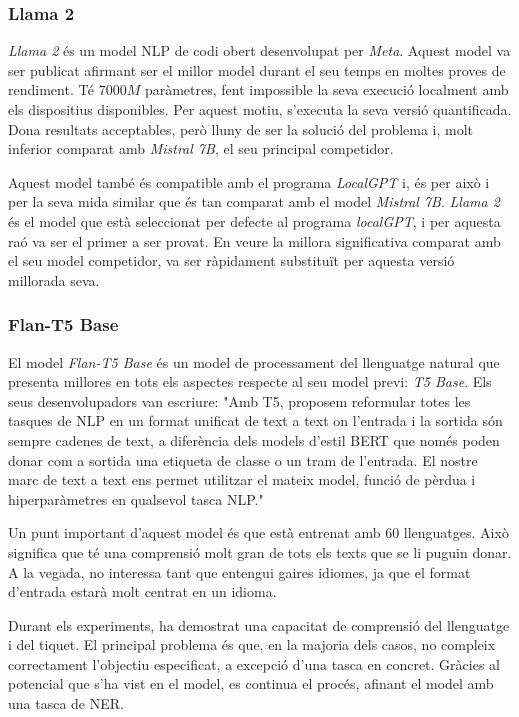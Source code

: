 \subsubsection{Llama 2}
\textit{Llama 2} \cite{llama} és un model NLP de codi obert desenvolupat per \textit{Meta}. Aquest model va ser publicat afirmant ser el millor model durant el seu temps en moltes proves de rendiment. Té $7000M$ paràmetres, fent impossible la seva execució localment amb els dispositius disponibles. Per aquest motiu, s'executa la seva versió quantificada. Dona resultats acceptables, però lluny de ser la solució del problema i, molt inferior comparat amb \textit{Mistral 7B}, el seu principal competidor.

Aquest model també és compatible amb el programa \textit{LocalGPT} \cite{localgpt} i, és per això i per la seva mida similar que és tan comparat amb el model \textit{Mistral 7B}. \textit{Llama 2} és el model que està seleccionat per defecte al programa \textit{localGPT}, i per aquesta raó va ser el primer a ser provat. En veure la millora significativa comparat amb el seu model competidor, va ser ràpidament substituït per aquesta versió millorada seva.


\subsubsection{Flan-T5 Base}
El model \textit{Flan-T5 Base} \cite{flan-t5} és un model de processament del llenguatge natural que presenta millores en tots els aspectes respecte al seu model previ: \textit{T5 Base}. Els seus desenvolupadors van escriure: "Amb T5, proposem reformular totes les tasques de NLP en un format unificat de text a text on l'entrada i la sortida són sempre cadenes de text, a diferència dels models d'estil BERT que només poden donar com a sortida una etiqueta de classe o un tram de l'entrada. El nostre marc de text a text ens permet utilitzar el mateix model, funció de pèrdua i hiperparàmetres en qualsevol tasca NLP."

Un punt important d'aquest model és que està entrenat amb 60 llenguatges. Això significa que té una comprensió molt gran de tots els texts que se li puguin donar. A la vegada, no interessa tant que entengui gaires idiomes, ja que el format d'entrada estarà molt centrat en un idioma.

Durant els experiments, ha demostrat una capacitat de comprensió del llenguatge i del tiquet. El principal problema és que, en la majoria dels casos, no compleix correctament l'objectiu especificat, a excepció d'una tasca en concret. Gràcies al potencial que s'ha vist en el model, es continua el procés, afinant el model amb una tasca de NER.

